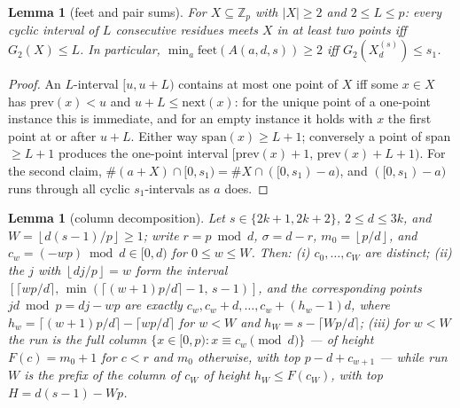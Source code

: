 \documentclass[11pt,a4paper]{article}
\numberwithin{equation}{section}
\theoremstyle{plain}
\newtheorem{lemma}[theorem]{Lemma}
\theoremstyle{definition}
\theoremstyle{remark}
\newcommand{\Z}{\mathbb{Z}}
\newcommand{\floor}[1]{\left\lfloor #1 \right\rfloor}
\begin{document}
\begin{lemma}[feet and pair sums]\label{lem:E0}
For $X\subseteq\Z_p$ with $|X|\ge2$ and $2\le L\le p$: every cyclic
interval of $L$ consecutive residues meets $X$ in at least two points
iff $G_2(X)\le L$. In particular,
$\min_a\mathrm{feet}(A(a,d,s))\ge2$ iff $G_2(X^{(s)}_d)\le s_1$.
\end{lemma}

\begin{proof}
An $L$-interval $[u,u+L)$ contains at most one point of $X$ iff some
$x\in X$ has $\mathrm{prev}(x)<u$ and $u+L\le\mathrm{next}(x)$: for the
unique point of a one-point instance this is immediate, and for an empty
instance it holds with $x$ the first point at or after $u+L$. Either
way $\mathrm{span}(x)\ge L+1$; conversely a point of span $\ge L+1$
produces the one-point interval $[\mathrm{prev}(x)+1,\,
\mathrm{prev}(x)+L+1)$. For the second claim,
$\#(a+X)\cap[0,s_1)=\#X\cap([0,s_1)-a)$, and $([0,s_1)-a)$ runs through
all cyclic $s_1$-intervals as $a$ does.
\end{proof}

\begin{lemma}[column decomposition]\label{lem:E1}
Let $s\in\{2k{+}1,2k{+}2\}$, $2\le d\le3k$, and
$W=\floor{d(s-1)/p}\ge1$; write $r=p\bmod d$, $\sigma=d-r$,
$m_0=\floor{p/d}$, and $c_w=(-wp)\bmod d\in[0,d)$ for $0\le w\le W$.
Then: \textup{(i)} $c_0,\dots,c_W$ are distinct; \textup{(ii)} the $j$
with $\floor{dj/p}=w$ form the interval
$[\lceil wp/d\rceil,\,\min(\lceil(w{+}1)p/d\rceil-1,\,s-1)]$, and the
corresponding points $jd\bmod p=dj-wp$ are exactly
$c_w,c_w+d,\dots,c_w+(h_w-1)d$, where
$h_w=\lceil(w{+}1)p/d\rceil-\lceil wp/d\rceil$ for $w<W$ and
$h_W=s-\lceil Wp/d\rceil$; \textup{(iii)} for $w<W$ the run is the
\emph{full} column $\{x\in[0,p):x\equiv c_w\pmod d\}$ --- of height
$F(c)=m_0+1$ for $c<r$ and $m_0$ otherwise, with top $p-d+c_{w+1}$ ---
while run $W$ is the prefix of the column of $c_W$ of height
$h_W\le F(c_W)$, with top $H=d(s-1)-Wp$.
\end{lemma}
\end{document}
